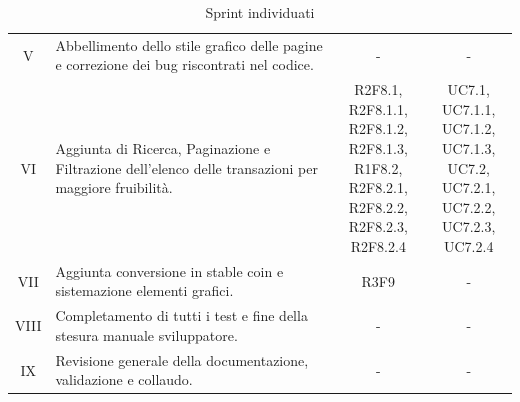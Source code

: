 \begin{table}[H]
\begin{tabular}{c|p{6cm}|c|c}
    V    & Abbellimento dello stile grafico delle pagine e correzione dei bug riscontrati nel codice.                                                                                            & -                                  & -             \\
    VI   & Aggiunta di Ricerca, Paginazione e Filtrazione dell'elenco delle transazioni per maggiore fruibilità.                                                                                 & \Shortunderstack{R2F8.1, R2F8.1.1,                 \\R2F8.1.2, R2F8.1.3,\\R1F8.2, R2F8.2.1,\\R2F8.2.2, R2F8.2.3,\\R2F8.2.4\\} & \Shortunderstack{UC7.1, UC7.1.1,\\UC7.1.2, UC7.1.3,\\UC7.2, UC7.2.1,\\UC7.2.2, UC7.2.3,\\UC7.2.4\\} \\
    VII  & Aggiunta conversione in stable coin e sistemazione elementi grafici.                                                                                                                  & R3F9                      & - \\
    VIII & Completamento di tutti i test e fine della stesura manuale sviluppatore.                                                                                                              & -                                  & -             \\
    IX   & Revisione generale della documentazione, validazione e collaudo.                                                                                                                      & -                                  & -             \\
  \end{tabular}
  \caption{Sprint individuati}
\end{table}
\pagebreak